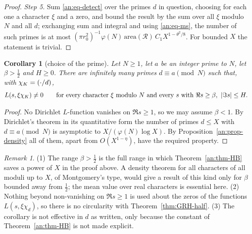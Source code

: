 \documentclass[10pt]{amsart}
\newtheorem{corollary}[theorem]{Corollary}
\theoremstyle{definition}
\theoremstyle{remark}
\newtheorem{remark}[theorem]{Remark}
\begin{document}
\begin{proof}
\emph{Step 5.} Sum \eqref{an:eq-detect} over the primes $d$ in question,
choosing for each one a character $\xi$ and a zero, and bound the result by
the sum over all $\xi$ modulo $N$ and all $d$; exchanging sum and integral
and using \eqref{an:eq-ms}, the number of such primes is at most
$(\pi r_0^2)^{-1}\varphi(N)\,\mathrm{area}(\mathcal R)\,C_1X^{1-\theta^2/8}$.
For bounded $X$ the statement is trivial.
\end{proof}

\begin{corollary}[choice of the prime]\label{an:cor-choice}
Let $N\ge1$, let $a$ be an integer prime to $N$, let $\beta>\frac12$ and
$H\ge0$. There are infinitely many primes $d\equiv a\pmod N$ such that, with
$\chi_K=(\cdot/d)$,
\[
 L(s,\xi\chi_K)\ne0\qquad\text{for every character $\xi$ modulo $N$ and every $s$ with }\Re s\ge\beta,\ |\Im s|\le H .
\]
\end{corollary}
\begin{proof}
No Dirichlet $L$-function vanishes on $\Re s\ge1$, so we may assume
$\beta<1$. By Dirichlet's theorem in its quantitative form
\cite[Chapter~20]{Davenport} the number of primes $d\le X$ with
$d\equiv a\pmod N$ is asymptotic to $X/(\varphi(N)\log X)$. By
Proposition~\ref{an:prop-density} all of them, apart from $O(X^{1-\eta})$,
have the required property.
\end{proof}

\begin{remark}\label{an:rem-choice}
(1) The range $\beta>\frac12$ is the full range in which
Theorem~\ref{an:thm-HB} saves a power of $X$ in the proof above. A density
theorem for all characters of all moduli up to $X$, of Montgomery's type,
would give a result of this kind only for $\beta$ bounded away from
$\frac12$; the mean value over real characters is essential here.
(2) Nothing beyond non-vanishing on $\Re s\ge1$ is used about the zeros of
the functions $L(s,\xi\chi_d)$, so there is no circularity with
Theorem~\ref{thm:GRH-half}. (3) The corollary is not effective in $d$ as
written, only because the constant of Theorem~\ref{an:thm-HB} is not made
explicit.
\end{remark}
\end{document}

